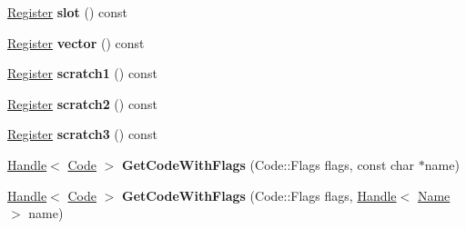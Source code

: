 \begin{DoxyCompactItemize}
\item 
\hyperlink{structv8_1_1internal_1_1_register}{Register} {\bfseries slot} () const \hypertarget{classv8_1_1internal_1_1_b_a_s_e___e_m_b_e_d_d_e_d_ae05578da97dc43df3d1aa7c6d44b9409}{}\label{classv8_1_1internal_1_1_b_a_s_e___e_m_b_e_d_d_e_d_ae05578da97dc43df3d1aa7c6d44b9409}

\item 
\hyperlink{structv8_1_1internal_1_1_register}{Register} {\bfseries vector} () const \hypertarget{classv8_1_1internal_1_1_b_a_s_e___e_m_b_e_d_d_e_d_a9e6de1c676940f7791c69efda6818be9}{}\label{classv8_1_1internal_1_1_b_a_s_e___e_m_b_e_d_d_e_d_a9e6de1c676940f7791c69efda6818be9}

\item 
\hyperlink{structv8_1_1internal_1_1_register}{Register} {\bfseries scratch1} () const \hypertarget{classv8_1_1internal_1_1_b_a_s_e___e_m_b_e_d_d_e_d_a44c388f1eb52d4d281f64514d61715db}{}\label{classv8_1_1internal_1_1_b_a_s_e___e_m_b_e_d_d_e_d_a44c388f1eb52d4d281f64514d61715db}

\item 
\hyperlink{structv8_1_1internal_1_1_register}{Register} {\bfseries scratch2} () const \hypertarget{classv8_1_1internal_1_1_b_a_s_e___e_m_b_e_d_d_e_d_a3b75dac9b90e755457aaece4cca4d573}{}\label{classv8_1_1internal_1_1_b_a_s_e___e_m_b_e_d_d_e_d_a3b75dac9b90e755457aaece4cca4d573}

\item 
\hyperlink{structv8_1_1internal_1_1_register}{Register} {\bfseries scratch3} () const \hypertarget{classv8_1_1internal_1_1_b_a_s_e___e_m_b_e_d_d_e_d_a14fe801072439d5021c3181e07a25da4}{}\label{classv8_1_1internal_1_1_b_a_s_e___e_m_b_e_d_d_e_d_a14fe801072439d5021c3181e07a25da4}

\item 
\hyperlink{classv8_1_1internal_1_1_handle}{Handle}$<$ \hyperlink{classv8_1_1internal_1_1_code}{Code} $>$ {\bfseries Get\+Code\+With\+Flags} (Code\+::\+Flags flags, const char $\ast$name)\hypertarget{classv8_1_1internal_1_1_b_a_s_e___e_m_b_e_d_d_e_d_a138b213c27aa8c946fb6ac65a521846a}{}\label{classv8_1_1internal_1_1_b_a_s_e___e_m_b_e_d_d_e_d_a138b213c27aa8c946fb6ac65a521846a}

\item 
\hyperlink{classv8_1_1internal_1_1_handle}{Handle}$<$ \hyperlink{classv8_1_1internal_1_1_code}{Code} $>$ {\bfseries Get\+Code\+With\+Flags} (Code\+::\+Flags flags, \hyperlink{classv8_1_1internal_1_1_handle}{Handle}$<$ \hyperlink{classv8_1_1internal_1_1_name}{Name} $>$ name)\hypertarget{classv8_1_1internal_1_1_b_a_s_e___e_m_b_e_d_d_e_d_a7f7e0f09e6cd8aea38d1f1b8f6504148}{}\label{classv8_1_1internal_1_1_b_a_s_e___e_m_b_e_d_d_e_d_a7f7e0f09e6cd8aea38d1f1b8f6504148}


\end{DoxyCompactItemize}
